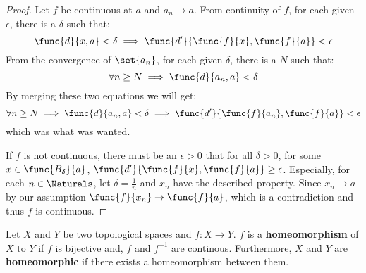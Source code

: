 \begin{proof}
    Let \(f\) be continuous at \(a\) and \(a_n \to a\). From continuity of \(f\), for each given \(\epsilon\), there is a \(\delta\) such that:
    \begin{equation*}
        \func{d}{x,a} < \delta \implies \func{d'}{\func{f}{x},\func{f}{a}} < \epsilon
    \end{equation*}
    From the convergence of \(\set{a_n}\), for each given \(\delta\), there is a \(N\) such that:
    \begin{equation*}
        \forall n \geq N \implies \func{d}{a_n,a} < \delta
    \end{equation*}
    By merging these two equations we will get:
    \begin{equation*}
        \forall n \geq N \implies  \func{d}{a_n,a} < \delta \implies \func{d'}{\func{f}{a_n},\func{f}{a}} < \epsilon
    \end{equation*}
    which was what was wanted.

    If \(f\) is not continuous, there must be an \(\epsilon > 0\) that for all \(\delta > 0 \), for some  \(x \in \func{B_\delta}{a}\), \( \func{d'}{\func{f}{x},\func{f}{a}} \geq \epsilon\). Especially, for each \(n \in \Naturals\), let \(\delta = \frac{1}{n}\) and \(x_n\) have the described property. Since \(x_n \to a\) by our assumption \(\func{f}{x_n} \to \func{f}{a}\), which is a contradiction and thus \(f\) is continuous.
\end{proof}

\begin{definition}
    Let \(X\) and \(Y\) be two topological spaces and \(f:X \to Y\). \(f\) is a \textbf{homeomorphism} of \(X\) to \(Y\) if \(f\) is bijective and, \(f\) and \(f^{-1}\) are continous. Furthermore, \(X\) and \(Y\) are \textbf{homeomorphic} if there exists a homeomorphism between them.
\end{definition}

